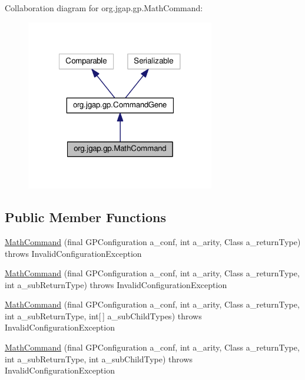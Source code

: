Collaboration diagram for org.\-jgap.\-gp.\-Math\-Command\-:
\nopagebreak
\begin{figure}[H]
\begin{center}
\leavevmode
\includegraphics[width=233pt]{classorg_1_1jgap_1_1gp_1_1_math_command__coll__graph}
\end{center}
\end{figure}
\subsection*{Public Member Functions}
\begin{DoxyCompactItemize}
\item 
\hyperlink{classorg_1_1jgap_1_1gp_1_1_math_command_a143bf170d280e9026117e31f201cd8fc}{Math\-Command} (final G\-P\-Configuration a\-\_\-conf, int a\-\_\-arity, Class a\-\_\-return\-Type)  throws Invalid\-Configuration\-Exception 
\item 
\hyperlink{classorg_1_1jgap_1_1gp_1_1_math_command_a51f7d9efa01908e58ab26542a33060cf}{Math\-Command} (final G\-P\-Configuration a\-\_\-conf, int a\-\_\-arity, Class a\-\_\-return\-Type, int a\-\_\-sub\-Return\-Type)  throws Invalid\-Configuration\-Exception 
\item 
\hyperlink{classorg_1_1jgap_1_1gp_1_1_math_command_a8a6298f3aa036553a73919ce91463511}{Math\-Command} (final G\-P\-Configuration a\-\_\-conf, int a\-\_\-arity, Class a\-\_\-return\-Type, int a\-\_\-sub\-Return\-Type, int\mbox{[}$\,$\mbox{]} a\-\_\-sub\-Child\-Types)  throws Invalid\-Configuration\-Exception 
\item 
\hyperlink{classorg_1_1jgap_1_1gp_1_1_math_command_a34a0b84c88c248772d82f7dc27410825}{Math\-Command} (final G\-P\-Configuration a\-\_\-conf, int a\-\_\-arity, Class a\-\_\-return\-Type, int a\-\_\-sub\-Return\-Type, int a\-\_\-sub\-Child\-Type)  throws Invalid\-Configuration\-Exception 
\end{DoxyCompactItemize}
